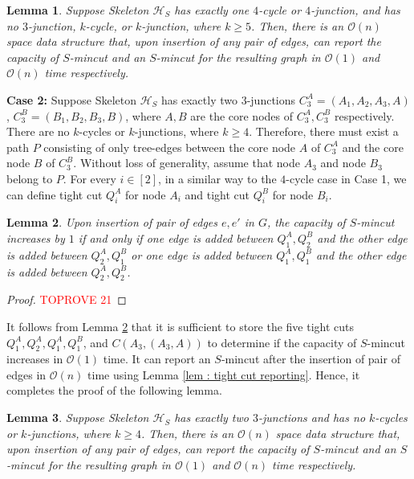 \documentclass[letterpaper,11pt]{article}
\newtheorem{lemma}{Lemma}[]
\begin{document}
\begin{lemma} \label{lem : 4-junction or 4-cycles}
    Suppose Skeleton ${\mathcal H}_S$ has exactly one $4$-cycle or $4$-junction, and has no $3$-junction, $k$-cycle, or $k$-junction, where $k\ge 5$. Then, there is an ${\mathcal O}(n)$ space data structure that, upon insertion of any pair of edges, can report the capacity of $S$-mincut and an $S$-mincut for the resulting graph in ${\mathcal O}(1)$ and ${\mathcal O}(n)$ time respectively.
\end{lemma}
\noindent
\textbf{Case 2:} Suppose Skeleton ${\mathcal H}_S$ has exactly two $3$-junctions $C_3^A=(A_1,A_2,A_3,A)$, $C_3^B=(B_1,B_2,B_3,B)$, where $A,B$ are the core nodes of $C_3^A,C_3^B$ respectively. There are no $k$-cycles or $k$-junctions, where $k\ge 4$. Therefore, there must exist a path $P$ consisting of only tree-edges between the core node $A$ of $C_3^A$ and the core node $B$ of $C_3^B$. Without loss of generality, assume that node $A_3$ and node $B_3$ belong to $P$. For every $i\in [2]$, in a similar way to the $4$-cycle case in Case 1, we can define tight cut $Q_i^A$ for node $A_i$ and tight cut $Q_i^B$ for node $B_i$.

\begin{lemma} \label{lem : case 2 main lemma}
    Upon insertion of pair of edges $e,e'$ in $G$, the capacity of $S$-mincut increases by $1$ if and only if one edge is added between $Q_1^A,Q_2^B$ and the other edge is added between $Q_2^A,Q_1^B$ or one edge is added between $Q_1^A,Q_1^B$ and the other edge is added between $Q_2^A,Q_2^B$.  
\end{lemma}
\begin{proof}\textcolor{red}{TOPROVE 21}\end{proof}
It follows from Lemma \ref{lem : case 2 main lemma} that it is sufficient to store the five tight cuts $Q_1^A,Q_2^A,Q_1^A,Q_1^B$, and $C(A_3,(A_3,A))$ to determine if the capacity of $S$-mincut increases in ${\mathcal O}(1)$ time. It can report an $S$-mincut after the insertion of pair of edges in ${\mathcal O}(n)$ time using Lemma \ref{lem : tight cut reporting}. 
Hence, it completes the proof of the following lemma.
\begin{lemma} \label{lem : case 2}
    Suppose Skeleton ${\mathcal H}_S$ has exactly two $3$-junctions and has no $k$-cycles or $k$-junctions, where $k\ge 4$. Then, there is an ${\mathcal O}(n)$ space data structure that, upon insertion of any pair of edges, can report the capacity of $S$-mincut and an $S$-mincut for the resulting graph in ${\mathcal O}(1)$ and ${\mathcal O}(n)$ time respectively.
\end{lemma}
\end{document}
